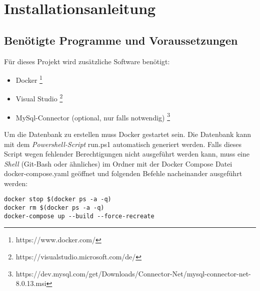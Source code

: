 \section{Installationsanleitung}

\subsection{Benötigte Programme und Voraussetzungen}
Für dieses Projekt wird zusätzliche Software benötigt:
\begin{itemize}
\item Docker \footnote{https://www.docker.com/}
\item Visual Studio \footnote{https://visualstudio.microsoft.com/de/}
\item MySql-Connector (optional, nur falls notwendig) \footnote{https://dev.mysql.com/get/Downloads/Connector-Net/mysql-connector-net-8.0.13.msi}
\end{itemize}
\raggedright

Um die Datenbank zu erstellen muss Docker gestartet sein. Die Datenbank kann mit dem \textit{Powershell-Script} \grqq{}run.ps1 \grqq{} automatisch generiert werden.
Falls dieses Script wegen fehlender Berechtigungen nicht ausgeführt werden kann, muss eine \textit{Shell} (Git-Bash oder ähnliches) im Ordner mit der Docker Compose Datei \grqq{}docker-compose.yaml \grqq{} geöffnet und folgenden Befehle nacheinander ausgeführt werden:
\begin{verbatim}
docker stop $(docker ps -a -q)
docker rm $(docker ps -a -q)
docker-compose up --build --force-recreate
\end{verbatim}

